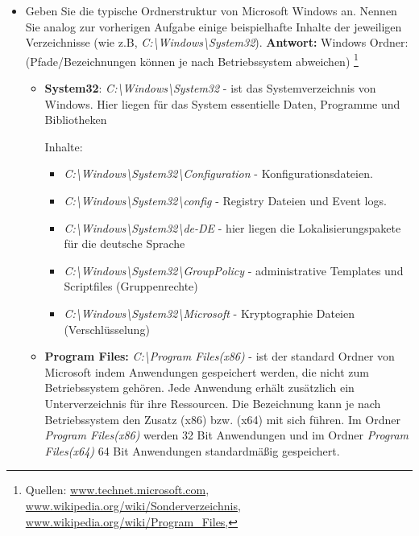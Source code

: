 \begin{itemize}
\begin{itemize}
		\end{itemize}
\item Geben Sie die typische Ordnerstruktur von Microsoft Windows an. Nennen Sie analog
zur vorherigen Aufgabe einige beispielhafte Inhalte der jeweiligen Verzeichnisse (wie z.B,
\textit{C:\textbackslash Windows\textbackslash System32}).
\textbf{Antwort:} Windows Ordner: (Pfade/Bezeichnungen können je nach Betriebssystem abweichen)
\footnote{Quellen:
\href{https://technet.microsoft.com/en-us/library/bb457124.aspxEEAA}{www.technet.microsoft.com},
\href{https://de.wikipedia.org/wiki/Sonderverzeichnis}{www.wikipedia.org/wiki/Sonderverzeichnis},
\href{https://en.wikipedia.org/wiki/Program_Files}{www.wikipedia.org/wiki/Program\_Files},
}

\begin{itemize}
	\item \textbf{System32}:	\textit{C:\textbackslash Windows\textbackslash System32} -
	ist das Systemverzeichnis von Windows. Hier liegen für das System essentielle
	Daten, Programme und Bibliotheken

	Inhalte:
	\begin{itemize}
		\item \textit{C:\textbackslash Windows\textbackslash System32\textbackslash Configuration} - Konfigurationsdateien.
		\item \textit{C:\textbackslash Windows\textbackslash System32\textbackslash config} - Registry Dateien und Event logs.
		\item \textit{C:\textbackslash Windows\textbackslash System32\textbackslash de-DE} - hier liegen die Lokalisierungspakete für die deutsche Sprache
		\item \textit{C:\textbackslash Windows\textbackslash System32\textbackslash GroupPolicy} - administrative Templates und Scriptfiles (Gruppenrechte)
		\item \textit{C:\textbackslash Windows\textbackslash System32\textbackslash Microsoft} - Kryptographie Dateien (Verschlüsselung)
\end{itemize}
 \item \textbf{Program Files:}	 \textit{C:\textbackslash Program Files(x86)} -
	ist der standard Ordner von Microsoft indem Anwendungen gespeichert werden, die
	nicht zum Betriebssystem gehören. Jede Anwendung erhält zusätzlich ein Unterverzeichnis für
	ihre Ressourcen. Die Bezeichnung kann je nach Betriebssystem den Zusatz (x86) bzw. (x64) mit
	sich führen. Im Ordner \textit{Program Files(x86)} werden 32 Bit Anwendungen und im Ordner
	\textit{Program Files(x64)} 64 Bit Anwendungen standardmäßig gespeichert.


\end{itemize}
\end{itemize}
